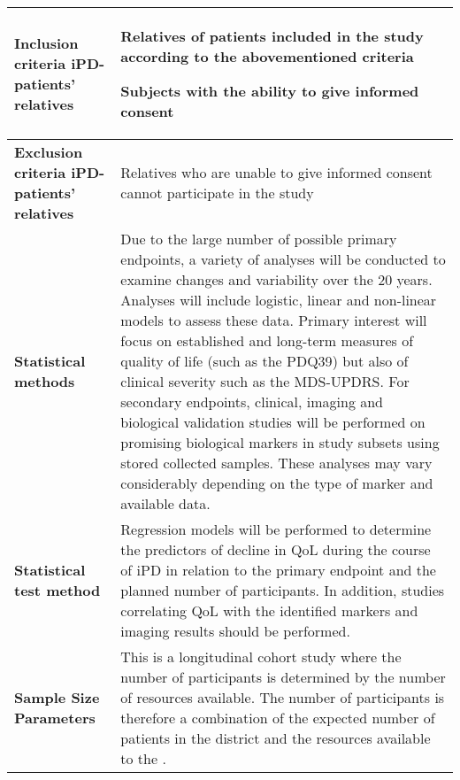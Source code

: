 \begin{tabularx}{\textwidth}{p{3.5cm} | X}
\textbf{Inclusion criteria \ac{iPD}-patients' relatives} &
\begin{tabitemize}
\item Relatives of patients included in the study according to the abovementioned criteria
\item Subjects with the ability to give informed consent
\end{tabitemize}
\\ \midrule

\textbf{Exclusion criteria \ac{iPD}-patients' relatives} &
Relatives who are unable to give informed consent cannot participate in the study
\\ \midrule

\textbf{Statistical methods} &
Due to the large number of possible primary endpoints, a variety of analyses will be conducted to examine changes and variability over the 20 years. Analyses will include logistic, linear and non-linear models to assess these data. Primary interest will focus on established and long-term measures of quality of life (such as the \ac{PDQ39}\cite{jenkinson1997pdq39}) but also of clinical severity such as the \ac{MDS-UPDRS}\cite{goetz2007updrs}. For secondary endpoints, clinical, imaging and biological validation studies will be performed on promising biological markers in study subsets using stored collected samples. These analyses may vary considerably depending on the type of marker and available data.\\ \midrule

\textbf{Statistical test method} & 
Regression models will be performed to determine the predictors of decline in \ac{QoL} during the course of \ac{iPD} in relation to the primary endpoint and the planned number of participants. In addition, studies correlating \ac{QoL} with the identified markers and imaging results should be performed.\\ \midrule

\textbf{Sample Size Parameters} & 
This is a longitudinal cohort study where the number of participants is determined by the number of resources available. The number of participants is therefore a combination of the expected number of patients in the district and the resources available to the \UKM{}.
\\ \bottomrule
\end{tabularx}
